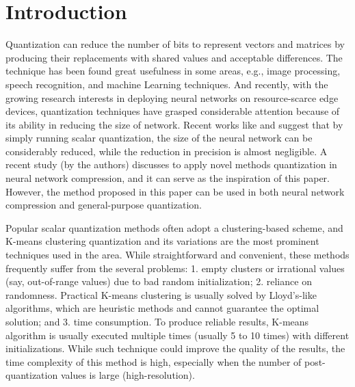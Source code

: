 \documentclass[preprint,10pt]{elsarticle}
\begin{document}
\section{Introduction}
Quantization can reduce the number of bits to represent vectors and matrices by producing their replacements with shared values and acceptable differences. The technique has been found great usefulness in some areas, e.g., image processing\cite{QuantizationImageProcessing}, speech recognition\cite{QuantizationSpeechRecognition}, and machine Learning techniques\cite{QuantizationNearestNeighbour}. And recently, with the growing research interests in deploying neural networks on resource-scarce edge devices, quantization techniques have grasped considerable attention because of its ability in reducing the size of network\cite{SoftWeightSharing2011}\cite{SongHan2015NetworkCompression}\cite{EfficientProcessingDL_Tutorial}\cite{gong2014compressing}. Recent works like \cite{gong2014compressing} and \cite{SongHan2015NetworkCompression} suggest that by simply running scalar quantization, the size of the neural network can be considerably reduced, while the reduction in precision is almost negligible. A recent study \cite{EmbeddedDeepLearningThesis} (by the authors) discusses to apply novel methods quantization in neural network compression, and it can serve as the inspiration of this paper. However, the method proposed in this paper can be used in both neural network compression and general-purpose quantization.\par
Popular scalar quantization methods often adopt a clustering-based scheme\cite{EfficientProcessingDL_Tutorial}, and K-means clustering quantization and its variations are the most prominent techniques used in the area. While straightforward and convenient, these methods frequently suffer from the several problems: 1. empty clusters or irrational values (say, out-of-range values) due to bad random initialization; 2. reliance on randomness. Practical K-means clustering is usually solved by Lloyd's-like algorithms, which are heuristic methods and cannot guarantee the optimal solution; and 3. time consumption. To produce reliable results, K-means algorithm is usually executed multiple times (usually 5 to 10 times) with different initializations. While such technique could improve the quality of the results, the time complexity of this method is high, especially when the number of post-quantization values is large (high-resolution).\par
\end{document}
